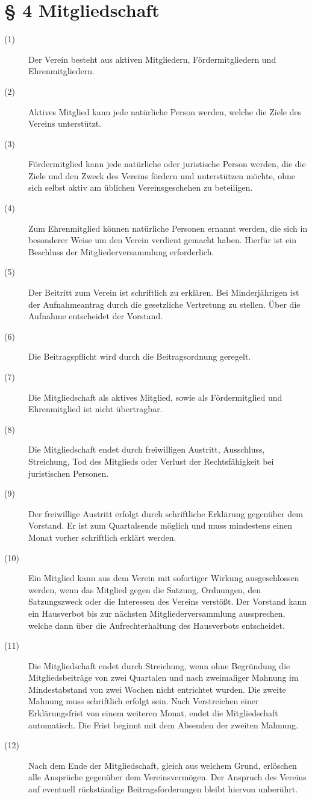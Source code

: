 \documentclass[a4paper,12pt]{scrartcl}
\begin{document}
\section*{\S{} 4 Mitgliedschaft}
\begin{description} 

\item[(1)] Der Verein besteht aus aktiven Mitgliedern, Fördermitgliedern und Ehrenmitgliedern.
\item[(2)] Aktives Mitglied kann jede natürliche Person werden, welche die Ziele des Vereins unterstützt.
\item[(3)] Fördermitglied kann jede natürliche oder juristische Person werden, die die Ziele und den Zweck des Vereins fördern und unterstützen möchte, ohne sich selbst aktiv am üblichen Vereinsgeschehen zu beteiligen.
\item[(4)] Zum Ehrenmitglied können natürliche Personen ernannt werden, die sich in besonderer Weise um den Verein verdient gemacht haben. Hierfür ist ein Beschluss der Mitgliederversammlung erforderlich.
\item[(5)] Der Beitritt zum Verein ist schriftlich zu erklären. Bei Minderjährigen ist der Aufnahmeantrag durch die gesetzliche Vertretung zu stellen. Über die Aufnahme entscheidet der Vorstand.
\item[(6)] Die Beitragspflicht wird durch die Beitragsordnung geregelt.
\item[(7)] Die Mitgliedschaft als aktives Mitglied, sowie als Fördermitglied und Ehrenmitglied ist nicht übertragbar. 
\item[(8)] Die Mitgliedschaft endet durch freiwilligen Austritt, Ausschluss, Streichung, Tod des Mitglieds oder Verlust der Rechtsfähigkeit bei juristischen Personen. 
\item[(9)] Der freiwillige Austritt erfolgt durch schriftliche Erklärung gegenüber dem Vorstand. Er ist zum Quartalsende möglich und muss mindestens einen Monat vorher schriftlich erklärt werden. 
\item[(10)] Ein Mitglied kann aus dem Verein mit sofortiger Wirkung ausgeschlossen werden, wenn das Mitglied gegen die Satzung, Ordnungen, den Satzungszweck oder die Interessen des Vereins verstößt. Der Vorstand kann ein Hausverbot bis zur nächsten Mitgliederversammlung aussprechen, welche dann über die Aufrechterhaltung des Hausverbots entscheidet. 
\item[(11)] Die Mitgliedschaft endet durch Streichung, wenn ohne Begründung die Mitgliedsbeiträge von zwei Quartalen und nach zweimaliger Mahnung im Mindestabstand von zwei Wochen nicht entrichtet wurden. Die zweite Mahnung muss schriftlich erfolgt sein. Nach Verstreichen einer Erklärungsfrist von einem weiteren Monat, endet die Mitgliedschaft automatisch. Die Frist beginnt mit dem Absenden der zweiten Mahnung. 
\item[(12)] Nach dem Ende der Mitgliedschaft, gleich aus welchem Grund, erlöschen alle Ansprüche gegenüber dem Vereinsvermögen. Der Anspruch des Vereins auf eventuell rückständige Beitragsforderungen bleibt hiervon unberührt.

\end{description}
\end{document}
